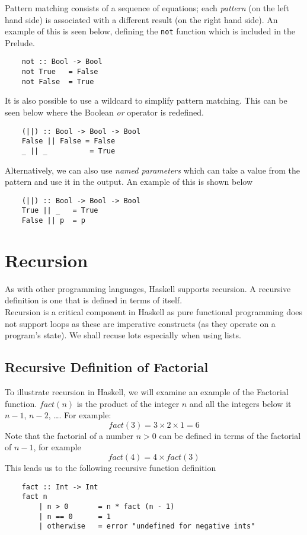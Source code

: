 Pattern matching consists of a sequence of equations; each \textit{pattern} (on the left hand side) is associated with a different result (on the right hand side). An example of this is seen below, defining the \verb|not| function which is included in the Prelude.
\begin{verbatim}
    not :: Bool -> Bool
    not True   = False
    not False  = True
\end{verbatim}

It is also possible to use a wildcard to simplify pattern matching. This can be seen below where the Boolean \textit{or} operator is redefined.
\begin{verbatim}
    (||) :: Bool -> Bool -> Bool
    False || False = False
    _ || _          = True
\end{verbatim}
Alternatively, we can also use \textit{named parameters} which can take a value from the pattern and use it in the output. An example of this is shown below
\begin{verbatim}
    (||) :: Bool -> Bool -> Bool
    True || _   = True
    False || p  = p
\end{verbatim}


\section{Recursion}
As with other programming languages, Haskell supports recursion. A recursive definition is one that is defined in terms of itself.\\

Recursion is a critical component in Haskell as pure functional programming does not support loops as these are imperative constructs (as they operate on a program's state). We shall recuse lots especially when using lists.

\subsection{Recursive Definition of Factorial}
To illustrate recursion in Haskell, we will examine an example of the Factorial function. $fact(n)$ is the product of the integer $n$ and all the integers below it $n-1$, $n-2$, \ldots. For example:
\[ fact(3) = 3 \times 2 \times 1 = 6 \]
Note that the factorial of a number $n > 0$ can be defined in terms of the factorial of $n-1$, for example
\[ fact(4) = 4 \times fact(3) \]
This leads us to the following recursive function definition
\begin{verbatim}
    fact :: Int -> Int
    fact n
        | n > 0       = n * fact (n - 1)
        | n == 0      = 1
        | otherwise   = error "undefined for negative ints"
\end{verbatim}

